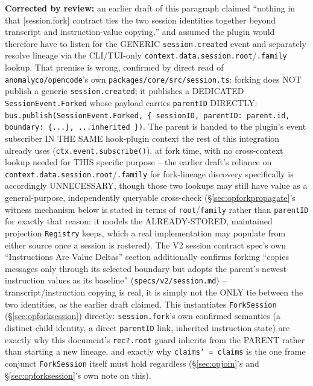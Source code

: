 \documentclass[a4paper,10pt,fleqn]{article}
\newcommand{\fpath}[1]{\texttt{#1}}
\newcommand{\field}[1]{\texttt{#1}}
\begin{document}
\textbf{Corrected by review:} an earlier draft of this paragraph
claimed ``nothing in that [session.fork] contract ties the two session
identities together beyond transcript and instruction-value copying,''
and assumed the plugin would therefore have to listen for the GENERIC
\field{session.created} event and separately resolve lineage via the
CLI/TUI-only \field{context.data.session.root}/\field{.family} lookup.
That premise is wrong, confirmed by direct read of
\fpath{anomalyco/opencode}'s own \fpath{packages/core/src/session.ts}:
forking does NOT publish a generic \field{session.created}; it publishes
a DEDICATED \field{SessionEvent.Forked} whose payload carries
\field{parentID} DIRECTLY: \texttt{bus.publish(SessionEvent.Forked, \{
sessionID, parentID: parent.id, boundary: \{...\}, ...inherited \})}.
The parent is handed to the plugin's event subscriber IN THE SAME
hook-plugin context the rest of this integration already uses
(\field{ctx.event.subscribe()}), at fork time, with no cross-context
lookup needed for THIS specific purpose -- the earlier draft's reliance
on \field{context.data.session.root}/\field{.family} for fork-lineage
discovery specifically is accordingly UNNECESSARY, though those two
lookups may still have value as a general-purpose, independently
queryable cross-check (\S\ref{sec:opforkpropagate}'s witness mechanism
below is stated in terms of \field{root}/\field{family} rather than
\field{parentID} for exactly that reason: it models the ALREADY-STORED,
maintained projection \field{Registry} keeps, which a real
implementation may populate from either source once a session is
rostered). The V2 session contract spec's own ``Instructions Are Value
Deltas'' section additionally confirms forking ``copies messages only
through its selected boundary but adopts the parent's newest
instruction values as its baseline'' (\fpath{specs/v2/session.md}) --
transcript/instruction copying is real, it is simply not the ONLY tie
between the two identities, as the earlier draft claimed. This
instantiates \field{ForkSession} (\S\ref{sec:opforksession}) directly:
\field{session.fork}'s own confirmed semantics (a distinct child
identity, a direct \field{parentID} link, inherited instruction state)
are exactly why this document's \field{rec?.root} guard inherits from
the PARENT rather than starting a new lineage, and exactly why
\field{claims' = claims} is the one frame conjunct \field{ForkSession}
itself must hold regardless (\S\ref{sec:opjoin}'s and
\S\ref{sec:opforksession}'s own note on this).
\end{document}

